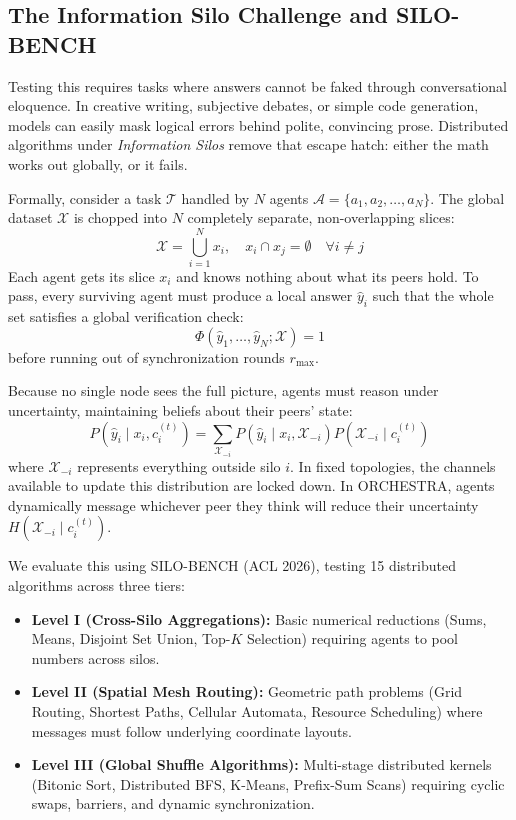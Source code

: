 \documentclass{ieeeaccess}
\begin{document}
\subsection{The Information Silo Challenge and SILO-BENCH}
Testing this requires tasks where answers cannot be faked through conversational eloquence. In creative writing, subjective debates, or simple code generation, models can easily mask logical errors behind polite, convincing prose. Distributed algorithms under \textit{Information Silos} remove that escape hatch: either the math works out globally, or it fails.

Formally, consider a task $\mathcal{T}$ handled by $N$ agents $\mathcal{A} = \{a_1, a_2, \dots, a_N\}$. The global dataset $\mathcal{X}$ is chopped into $N$ completely separate, non-overlapping slices:
\begin{equation}
\label{eq:partition_intro}
\mathcal{X} = \bigcup_{i=1}^N x_i, \quad x_i \cap x_j = \emptyset \quad \forall i \neq j
\end{equation}
Each agent gets its slice $x_i$ and knows nothing about what its peers hold. To pass, every surviving agent must produce a local answer $\hat{y}_i$ such that the whole set satisfies a global verification check:
\begin{equation}
\label{eq:predicate_intro}
\Phi(\hat{y}_1, \dots, \hat{y}_N; \mathcal{X}) = 1
\end{equation}
before running out of synchronization rounds $r_{\max}$.

Because no single node sees the full picture, agents must reason under uncertainty, maintaining beliefs about their peers' state:
\begin{equation}
\label{eq:epistemic_modeling}
P(\hat{y}_i \mid x_i, c_i^{(t)}) = \sum_{\mathcal{X}_{-i}} P(\hat{y}_i \mid x_i, \mathcal{X}_{-i}) P(\mathcal{X}_{-i} \mid c_i^{(t)})
\end{equation}
where $\mathcal{X}_{-i}$ represents everything outside silo $i$. In fixed topologies, the channels available to update this distribution are locked down. In ORCHESTRA, agents dynamically message whichever peer they think will reduce their uncertainty $H(\mathcal{X}_{-i} \mid c_i^{(t)})$.

We evaluate this using SILO-BENCH \cite{john2026silobench} (ACL 2026), testing 15 distributed algorithms across three tiers:
\begin{itemize}
    \item \textbf{Level I (Cross-Silo Aggregations):} Basic numerical reductions (Sums, Means, Disjoint Set Union, Top-$K$ Selection) requiring agents to pool numbers across silos.
    \item \textbf{Level II (Spatial Mesh Routing):} Geometric path problems (Grid Routing, Shortest Paths, Cellular Automata, Resource Scheduling) where messages must follow underlying coordinate layouts.
    \item \textbf{Level III (Global Shuffle Algorithms):} Multi-stage distributed kernels (Bitonic Sort, Distributed BFS, K-Means, Prefix-Sum Scans) requiring cyclic swaps, barriers, and dynamic synchronization.
\end{itemize}
\end{document}
